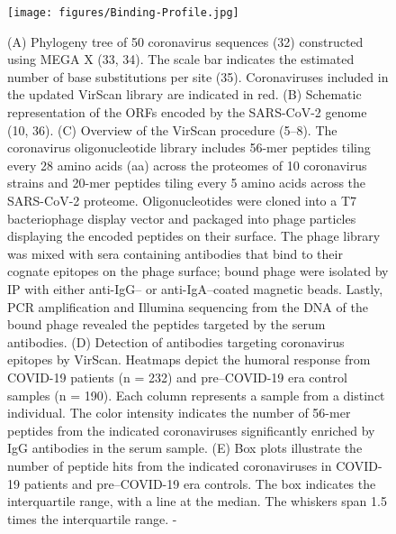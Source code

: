 \documentclass{article}
\begin{document}
\begin{figure}[h]
\centering
\texttt{[image: figures/Binding-Profile.jpg]}
    \caption{(A) Phylogeny tree of 50 coronavirus sequences (32) constructed using MEGA X (33, 34). The scale bar indicates the estimated number of base substitutions per site (35). Coronaviruses included in the updated VirScan library are indicated in red. (B) Schematic representation of the ORFs encoded by the SARS-CoV-2 genome (10, 36). (C) Overview of the VirScan procedure (5–8). The coronavirus oligonucleotide library includes 56-mer peptides tiling every 28 amino acids (aa) across the proteomes of 10 coronavirus strains and 20-mer peptides tiling every 5 amino acids across the SARS-CoV-2 proteome. Oligonucleotides were cloned into a T7 bacteriophage display vector and packaged into phage particles displaying the encoded peptides on their surface. The phage library was mixed with sera containing antibodies that bind to their cognate epitopes on the phage surface; bound phage were isolated by IP with either anti-IgG– or anti-IgA–coated magnetic beads. Lastly, PCR amplification and Illumina sequencing from the DNA of the bound phage revealed the peptides targeted by the serum antibodies. (D) Detection of antibodies targeting coronavirus epitopes by VirScan. Heatmaps depict the humoral response from COVID-19 patients (n = 232) and pre–COVID-19 era control samples (n = 190). Each column represents a sample from a distinct individual. The color intensity indicates the number of 56-mer peptides from the indicated coronaviruses significantly enriched by IgG antibodies in the serum sample. (E) Box plots illustrate the number of peptide hits from the indicated coronaviruses in COVID-19 patients and pre–COVID-19 era controls. The box indicates the interquartile range, with a line at the median. The whiskers span 1.5 times the interquartile range. - \citep{Shrock2020}}
\label{fig:Binding-Profile}
\end{figure}
\end{document}
